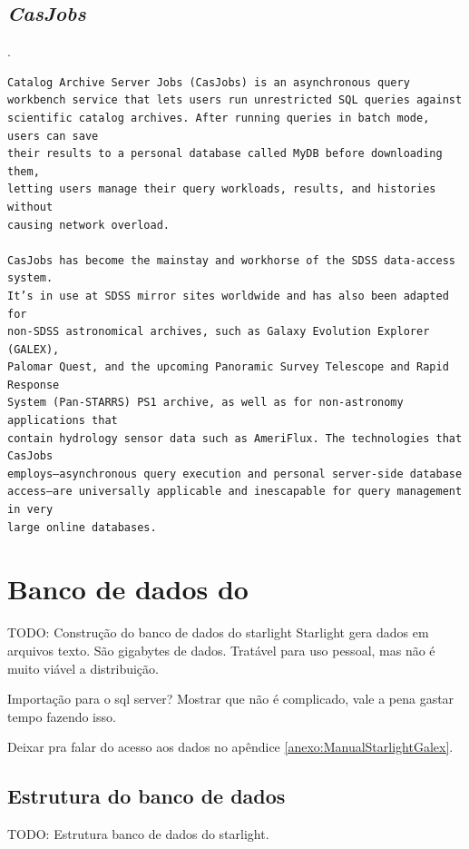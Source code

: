 \subsection{{\em CasJobs}}
\citet{Li2008}.
\begin{verbatim}
Catalog Archive Server Jobs (CasJobs) is an asynchronous query
workbench service that lets users run unrestricted SQL queries against
scientific catalog archives. After running queries in batch mode, users can save
their results to a personal database called MyDB before downloading them,
letting users manage their query workloads, results, and histories without
causing network overload.

CasJobs has become the mainstay and workhorse of the SDSS data-access system.
It’s in use at SDSS mirror sites worldwide and has also been adapted for
non-SDSS astronomical archives, such as Galaxy Evolution Explorer (GALEX),
Palomar Quest, and the upcoming Panoramic Survey Telescope and Rapid Response
System (Pan-STARRS) PS1 archive, as well as for non-astronomy applications that
contain hydrology sensor data such as AmeriFlux. The technologies that CasJobs
employs—asynchronous query execution and personal server-side database
access—are universally applicable and inescapable for query management in very
large online databases.
\end{verbatim}

\section{Banco de dados do \starlight}
TODO: Construção do banco de dados do starlight Starlight gera dados em arquivos
texto. São gigabytes de dados. Tratável para uso pessoal, mas não é muito viável
a distribuição.

Importação para o sql server? Mostrar que não é complicado, vale a pena gastar
tempo fazendo isso.

Deixar pra falar do acesso aos dados no apêndice
\ref{anexo:ManualStarlightGalex}.

\subsection{Estrutura do banco de dados}
TODO: Estrutura banco de dados do starlight.

